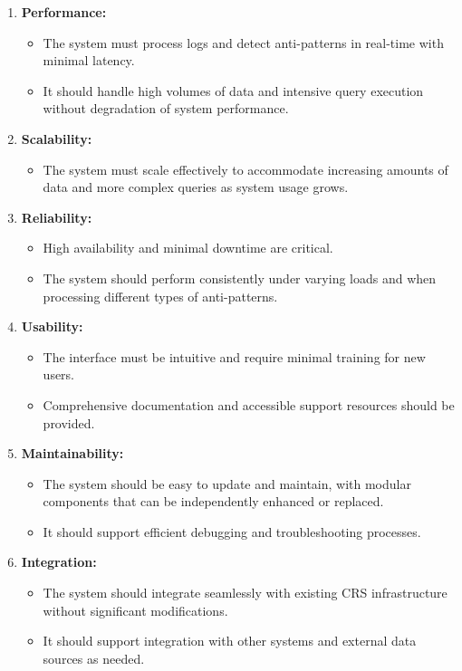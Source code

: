 \documentclass[12pt, times]{article}
\begin{document}
\begin{enumerate}
	\item \textbf{Performance:}
	\begin{itemize}
		\item The system must process logs and detect anti-patterns in real-time with minimal latency.
		\item It should handle high volumes of data and intensive query execution without degradation of system performance.
	\end{itemize}
	
	\item \textbf{Scalability:}
	\begin{itemize}
		\item The system must scale effectively to accommodate increasing amounts of data and more complex queries as system usage grows.
	\end{itemize}
	
	\item \textbf{Reliability:}
	\begin{itemize}
		\item High availability and minimal downtime are critical.
		\item The system should perform consistently under varying loads and when processing different types of anti-patterns.
	\end{itemize}
	
	\item \textbf{Usability:}
	\begin{itemize}
		\item The interface must be intuitive and require minimal training for new users.
		\item Comprehensive documentation and accessible support resources should be provided.
	\end{itemize}
	
	\item \textbf{Maintainability:}
	\begin{itemize}
		\item The system should be easy to update and maintain, with modular components that can be independently enhanced or replaced.
		\item It should support efficient debugging and troubleshooting processes.
	\end{itemize}
	
	\item \textbf{Integration:}
	\begin{itemize}
		\item The system should integrate seamlessly with existing CRS infrastructure without significant modifications.
		\item It should support integration with other systems and external data sources as needed.
	\end{itemize}
\end{enumerate}
\end{document}

